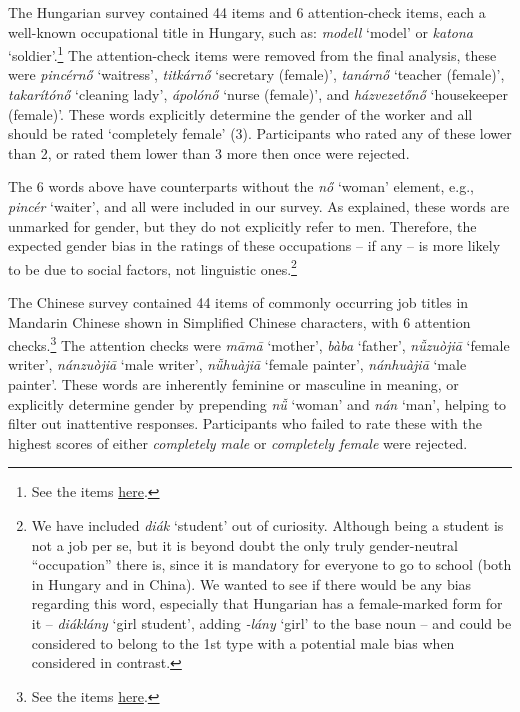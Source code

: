 \documentclass[10pt, a4paper]{article}
\newcommand{\zh}[1]{\simplifiedchinesefont{#1}\rmfamily}
\begin{document}
The Hungarian survey contained 44 items 
and 6 attention-check items, each a well-known occupational title in Hungary, such as: \textit{modell} `model' or \textit{katona} `soldier'.\footnote{See the items \href{https://anonymous.4open.science/r/occupational-gender-bias/occupations.xlsx}{here}.} The attention-check items were removed from the final analysis, these were \textit{pincérnő} `waitress', \textit{titkárnő} `secretary (female)', \textit{tanárnő} `teacher (female)', \textit{takarítónő} `cleaning lady', \textit{ápolónő} `nurse (female)', and \textit{házvezetőnő} `housekeeper (female)'. These words explicitly determine the gender of the worker and all should be rated `completely female' (3). Participants who rated any of these lower than 2, or rated them lower than 3 more then once were rejected.

The 6 words above have counterparts without the \textit{nő} `woman' element, e.g., \textit{pincér} `waiter', and all were included in our survey. As explained, these words are unmarked for gender, but they do not explicitly refer to men. Therefore, the expected gender bias in the ratings of these occupations -- if any -- is more likely to be due to social factors, not linguistic ones.\footnote{We have included \textit{diák} `student' out of curiosity. Although being a student is not a job per se, but it is beyond doubt the only truly gender-neutral ``occupation'' there is, since it is mandatory for everyone to go to school (both in Hungary and in China). We wanted to see if there would be any bias regarding this word, especially that Hungarian has a female-marked form for it -- \textit{diáklány} `girl student', adding \textit{-lány} `girl' to the base noun -- and could be considered to belong to the 1st type with a potential male bias when considered in contrast.}

The Chinese survey contained 44 items of commonly occurring job titles in Mandarin Chinese shown in Simplified Chinese characters,
with 6 attention checks.\footnote{See the items \href{https://anonymous.4open.science/r/occupational-gender-bias/occupations.xlsx}{here}.} The attention checks were \zh{妈妈} \textit{māmā} `mother', \zh{爸爸} \textit{bàba} `father', \zh{女作家} \textit{nǚzuòjiā} `female writer', \zh{男作家} \textit{nánzuòjiā} `male writer', \zh{女画家} \textit{nǚhuàjiā} `female painter', \zh{男画家} \textit{nánhuàjiā} `male painter'. These words are inherently feminine or masculine in meaning, or explicitly determine gender by prepending \zh{女} \textit{nǚ} `woman' and \zh{男} \textit{nán} `man', helping to filter out inattentive responses. Participants who failed to rate these with the highest scores of either \textit{completely male} or \textit{completely female} were rejected.
\end{document}
